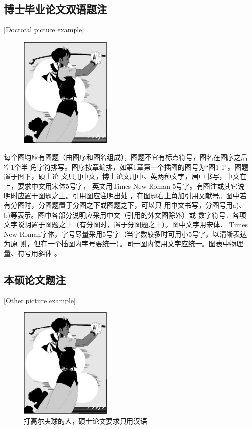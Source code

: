\subsection{博士毕业论文双语题注}[Doctoral picture example]
\begin{figure}[htpb]
\centering
\includegraphics[width = 0.4\textwidth]{golfer}
\end{figure}

每个图均应有图题（由图序和图名组成），图题不宜有标点符号，图名在图序之后空1个半
角字符排写。图序按章编排，如第1章第一个插图的图号为“图1-1”。图题置于图下，硕士论
文只用中文，博士论文用中、英两种文字，居中书写，中文在上，要求中文用宋体5号字，
英文用Times New Roman 5号字。有图注或其它说明时应置于图题之上。引用图应注明出处
，在图题右上角加引用文献号。图中若有分图时，分图题置于分图之下或图题之下，可以只
用中文书写，分图号用a)、b)等表示。图中各部分说明应采用中文（引用的外文图除外）或
数字符号，各项文字说明置于图题之上（有分图时，置于分图题之上）。图中文字用宋体、
Times New Roman字体，字号尽量采用5号字（当字数较多时可用小5号字，以清晰表达为原
则，但在一个插图内字号要统一）。同一图内使用文字应统一。图表中物理量、符号用斜体
。
\subsection{本硕论文题注}[Other picture example]
\begin{figure}[h]
\centering
\includegraphics[width = 0.4\textwidth]{golfer}
\caption{打高尔夫球的人，硕士论文要求只用汉语}
\end{figure}

